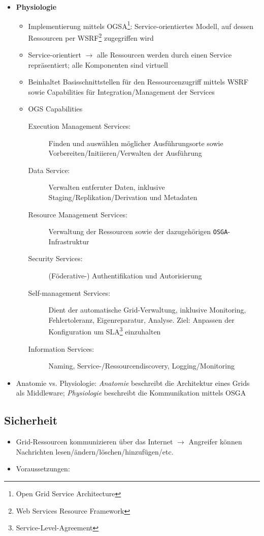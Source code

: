 \begin{itemize}
\begin{itemize}
	\end{itemize}
	\item \textbf{Physiologie}
	\begin{itemize}
		\item Implementierung mittels OGSA\footnote{Open Grid Service Architecture}: Service-orientiertes Modell, auf dessen Ressourcen per WSRF\footnote{Web Services Resource Framework} zugegriffen wird
		\item Service-orientiert \(\rightarrow\) alle Ressourcen werden durch einen Service repräsentiert; alle Komponenten sind virtuell
		\item Beinhaltet Basisschnittstellen für den Ressourcenzugriff mittels WSRF sowie Capabilities für Integration/Management der Services
		\item OGS Capabilities
		\begin{description}
			\item[Execution Management Services:] Finden und auswählen möglicher Ausführungsorte sowie Vorbereiten/Initiieren/Verwalten der Ausführung
			\item[Data Service:] Verwalten entfernter Daten, inklusive Staging/Replikation/Derivation und Metadaten
			\item[Resource Management Services:] Verwaltung der Ressourcen sowie der dazugehörigen \texttt{OSGA}-Infrastruktur
			\item[Security Services:] (Föderative-) Authentifikation und Autorisierung
			\item[Self-management Services:] Dient der automatische Grid-Verwaltung, inklusive Monitoring, Fehlertoleranz, Eigenreparatur, Analyse. Ziel: Anpassen der Konfiguration um SLA\footnote{Service-Level-Agreement} einzuhalten
			\item[Information Services:] Naming, Service-/Ressourcendiscovery, Logging/Monitoring
		\end{description}
	\end{itemize}
	\item Anatomie vs. Physiologie: \textit{Anatomie} beschreibt die Architektur eines Grids als Middleware; \textit{Physiologie} beschreibt die Kommunikation mittels OSGA
\end{itemize}


\subsection{Sicherheit}
\begin{itemize}
	\item Grid-Ressourcen kommunizieren über das Internet \(\rightarrow\) Angreifer können Nachrichten lesen/ändern/löschen/hinzufügen/etc.
	\item Voraussetzungen: %
\end{itemize}


